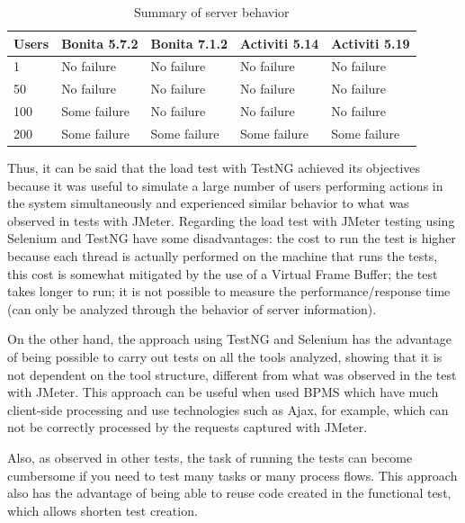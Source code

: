\documentclass[runningheads,a4paper]{llncs}
\begin{document}
\begin{table}
\centering
\begin{tabular}{p{2cm}|p{2cm}|p{2cm}|p{2cm}|p{2cm}}
\hline
Users & Bonita 5.7.2 & Bonita 7.1.2 & Activiti 5.14 & Activiti 5.19 \\\hline
1 & No failure & No failure & No failure & No failure \\\hline
50 & No failure & No failure & No failure & No failure \\\hline
100 & Some failure & No failure & No failure & No failure \\\hline
200 & Some failure & Some failure & Some failure & Some failure \\\hline
\end{tabular}
\caption{Summary of server behavior}
\label{tab:resultadoCargaSelenium}
\end{table}

Thus, it can be said that the load test with TestNG achieved its objectives because it was useful to simulate a large number of users performing actions in the system simultaneously and experienced similar behavior to what was observed in tests with JMeter. Regarding the load test with JMeter testing using Selenium and TestNG have some disadvantages: the cost to run the test is higher because each thread is actually performed on the machine that runs the tests, this cost is somewhat mitigated by the use of a Virtual Frame Buffer; the test takes longer to run; it is not possible to measure the performance/response time (can only be analyzed through the behavior of server information).

On the other hand, the approach using TestNG and Selenium has the advantage of being possible to carry out tests on all the tools analyzed, showing that it is not dependent on the tool structure, different from what was observed in the test with JMeter. This approach can be useful when used BPMS which have much client-side processing and use technologies such as Ajax, for example, which can not be correctly processed by the requests captured with JMeter.

Also, as observed in other tests, the task of running the tests can become cumbersome if you need to test many tasks or many process flows. This approach also has the advantage of being able to reuse code created in the functional test, which allows shorten test creation.
\end{document}
